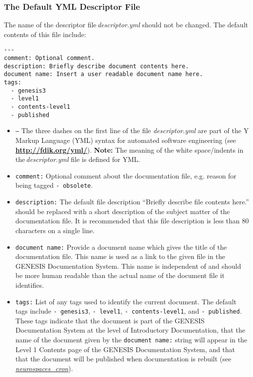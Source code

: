 \documentclass[12pt]{article}
\begin{document}
\subsubsection*{The Default YML Descriptor File}

The name of the descriptor file\,{\it descriptor.yml} should not be changed. The default contents of this file include:

\begin{verbatim}
---
comment: Optional comment.
description: Briefly describe document contents here. 
document name: Insert a user readable document name here.  
tags:
  - genesis3
  - level1
  - contents-level1
  - published
\end{verbatim}

\begin{itemize}

\item {\tt ---} The three dashes on the first line of the file {\it descriptor.yml} are part of the Y Markup Language (YML) syntax for automated software engineering (see \href{http://fdik.org/yml/}{\bf http://fdik.org/yml/}). {\bf Note:} The meaning of the white space/indents in the\,{\it descriptor.yml} file is defined for YML.

\item {\tt comment:} Optional comment about the documentation file, e.g. reason for being tagged {\tt -\,obsolete}.

\item {\tt description:} The default file description ``Briefly describe file contents here.'' should be replaced with a short description of the subject matter of the documentation file. It is recommended that this file description is less than 80 characters on a single line.

\item {\tt document name:} Provide a document name which gives the title of the documentation file. This name is used as a link to the given file in the GENESIS Documentation System. This name is independent of and should be more human readable than the actual name of the document file it identifies.

\item {\tt tags:} List of any tags used to identify the current document. The default tags include {\tt -\,genesis3}, {\tt -\,level1}, {\tt -\,contents-level1}, and {\tt -\,published}. These tags indicate that the document is part of the GENESIS Documentation System at the level of Introductory Documentation, that the name of the document given by the {\tt document name:} string will appear in the Level 1 Contents page of the GENESIS Documentation System, and that that the document will be published when documentation is rebuilt (see \href{../neurospaces-cron/neurospaces-cron.tex}{\it neurospaces\_cron}).


\end{itemize}
\end{document}
